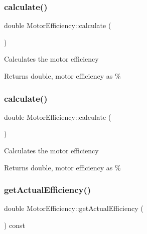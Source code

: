 \subsubsection{\texorpdfstring{calculate()}{calculate()}\hspace{0.1cm}{\footnotesize\ttfamily [2/3]}}
{\footnotesize\ttfamily double Motor\+Efficiency\+::calculate (\begin{DoxyParamCaption}{ }\end{DoxyParamCaption})}

Calculates the motor efficiency

\begin{DoxyReturn}{Returns}
double, motor efficiency as \% 
\end{DoxyReturn}
\mbox{\label{class_motor_efficiency_a448092c19177f5fff0c011f0c9398db0}} 
\subsubsection{\texorpdfstring{calculate()}{calculate()}\hspace{0.1cm}{\footnotesize\ttfamily [3/3]}}
{\footnotesize\ttfamily double Motor\+Efficiency\+::calculate (\begin{DoxyParamCaption}{ }\end{DoxyParamCaption})}

Calculates the motor efficiency

\begin{DoxyReturn}{Returns}
double, motor efficiency as \% 
\end{DoxyReturn}
\mbox{\label{class_motor_efficiency_ae40031307b8631cf40df1c4069069dc0}} 
\subsubsection{\texorpdfstring{get\+Actual\+Efficiency()}{getActualEfficiency()}\hspace{0.1cm}{\footnotesize\ttfamily [1/3]}}
{\footnotesize\ttfamily double Motor\+Efficiency\+::get\+Actual\+Efficiency (\begin{DoxyParamCaption}{ }\end{DoxyParamCaption}) const\hspace{0.3cm}{\ttfamily [inline]}}

